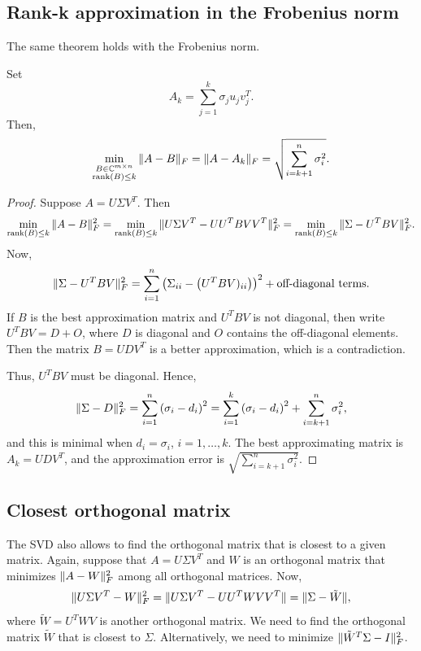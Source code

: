 \documentclass{article}
\begin{document}
\subsection{Rank-k approximation in the Frobenius norm}

The same theorem holds with the Frobenius norm.
\begin{theorem} Set
\begin{equation*}
A_{k} = \sum_{j=1}^{k} \sigma_{j} u_{j} v_{j}^{T}.
\end{equation*}
Then,
\begin{equation*}
\min_{\substack{B \in \mathbb{C}^{m \times n} \\
\operatorname{rank}(B) \leq k}} \| A-B \|_{F} = \| A-A_{k} \|_{F}
= \sqrt{\sum_{i=k+1}^{n} \sigma_{i}^{2}}.
\end{equation*}
\end{theorem}
\begin{proof}
Suppose $A=U \Sigma V^{T}$. Then
\begin{equation*}
\min_{\operatorname{rank}(B) \leq k} \| A-B \|^{2}_{F} =
\min_{\operatorname{rank}(B) \leq k} \| U \Sigma V^{T} - UU^{T} B
VV^{T} \|^{2}_{F} = \min_{\operatorname{rank}(B) \leq k} \| \Sigma
- U^{T} B V \|^{2}_{F}.
\end{equation*}
Now,
\begin{equation*}
\| \Sigma - U^{T} B V \|^{2}_{F} = \sum_{i=1}^{n} \left (
\Sigma_{ii} - \left (U^{T}B V)_{ii} \right ) \right )^{2} +
\text{off-diagonal terms}.
\end{equation*}
If $B$ is the best approximation matrix and $U^{T}B V$ is not
diagonal, then write $U^{T}B V=D+O$, where $D$ is diagonal and $O$
contains the off-diagonal elements. Then the matrix $B = U D V^{T}$
is a better approximation, which is a contradiction.

Thus, $U^{T}B V$ must be diagonal. Hence,
\begin{equation*}
\| \Sigma - D \|^{2}_{F} = \sum_{i=1}^{n} \left (\sigma_{i} - d_{i}
\right )^{2} = \sum_{i=1}^{k} \left (\sigma_{i} - d_{i} \right )^{2}
+ \sum_{i=k+1}^{n} \sigma_{i}^{2},
\end{equation*}
and this is minimal when $d_{i}=\sigma_{i}$, $i=1,\ldots,k$. The
best approximating matrix is $A_{k} = U D V^{T}$, and the
approximation error is $\sqrt{\sum_{i=k+1}^{n} \sigma_{i}^{2}}$.
\end{proof}


\subsection{Closest orthogonal matrix}
The SVD also allows to find the orthogonal matrix that is closest to
a given matrix. Again, suppose that $A = U \Sigma V^{T}$ and $W$ is
an orthogonal matrix that minimizes $\| A-W \|^{2}_{F}$ among all
orthogonal matrices. Now,
\begin{equation*}
\| U \Sigma V^{T} - W \|_{F}^{2} = \| U \Sigma V^{T} - UU^{T} W
VV^{T} \| = \| \Sigma - \tilde{W} \|,
\end{equation*}
where $\tilde{W}=U^{T} W V$ is another orthogonal matrix. We need to
find the orthogonal matrix $\tilde{W}$ that is closest to $\Sigma$.
Alternatively, we need to minimize $\| \tilde{W}^{T} \Sigma -
I \|_{F}^{2}$.
\end{document}
